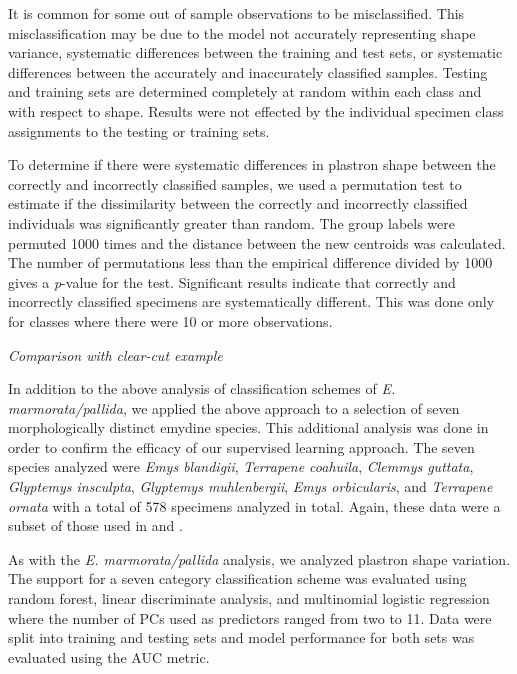 \documentclass[12pt,letterpaper]{article}
\renewcommand{\subsection}[1]{%
\bigskip
\begin{center}
\begin{large}
\normalfont\itshape #1
\end{large}
\end{center}}
\begin{document}
It is common for some out of sample observations to be misclassified. This misclassification may be due to the model not accurately representing shape variance, systematic differences between the training and test sets, or systematic differences between the accurately and inaccurately classified samples. Testing and training sets are determined completely at random within each class and with respect to shape. Results were not effected by the individual specimen class assignments to the testing or training sets.

To determine if there were systematic differences in plastron shape between the correctly and incorrectly classified samples, we used a permutation test to estimate if the dissimilarity between the correctly and incorrectly classified individuals was significantly greater than random. The group labels were permuted 1000 times and the distance between the new centroids was calculated. The number of permutations less than the empirical difference divided by 1000 gives a \textit{p}-value for the test. Significant results indicate that correctly and incorrectly classified specimens are systematically different. This was done only for classes where there were 10 or more observations.

\subsection{Comparison with clear-cut example}
In addition to the above analysis of classification schemes of \textit{E. marmorata/pallida}, we applied the above approach to a selection of seven morphologically distinct emydine species. This additional analysis was done in order to confirm the efficacy of our supervised learning approach. The seven species analyzed were \textit{Emys blandigii}, \textit{Terrapene coahuila}, \textit{Clemmys guttata}, \textit{Glyptemys insculpta}, \textit{Glyptemys muhlenbergii}, \textit{Emys orbicularis}, and \textit{Terrapene ornata} with a total of 578 specimens analyzed in total. Again, these data were a subset of those used in \citet{Angielczyk2011} and \citet{Angielczyk2013a}.

As with the \textit{E. marmorata/pallida} analysis, we analyzed plastron shape variation. The support for a seven category classification scheme was evaluated using random forest, linear discriminate analysis, and multinomial logistic regression where the number of PCs used as predictors ranged from two to 11. Data were split into training and testing sets and model performance for both sets was evaluated using the AUC metric.
\end{document}
